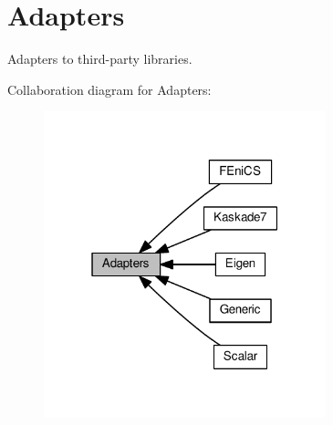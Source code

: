 \hypertarget{group__AdapterGroup}{}\section{Adapters}
\label{group__AdapterGroup}


Adapters to third-\/party libraries.  


Collaboration diagram for Adapters\+:
\nopagebreak
\begin{figure}[H]
\begin{center}
\leavevmode
\includegraphics[width=232pt]{group__AdapterGroup}
\end{center}
\end{figure}
